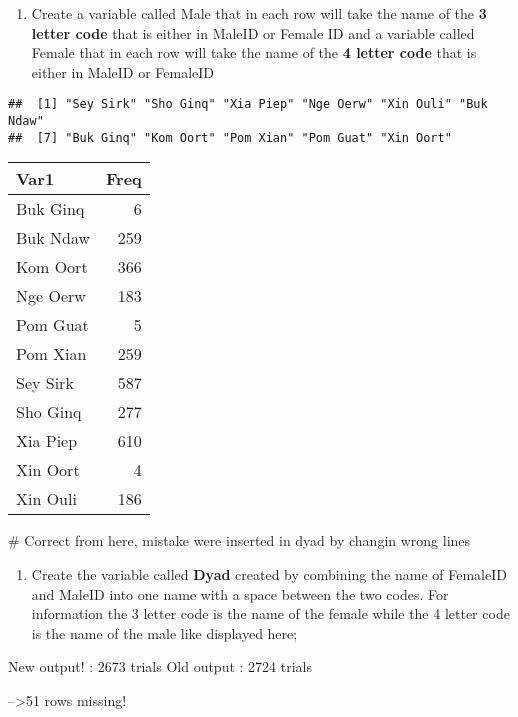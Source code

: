 \documentclass[
]{article}
\providecommand{\tightlist}{%
  \setlength{\itemsep}{0pt}\setlength{\parskip}{0pt}}
\begin{document}
\begin{enumerate}
\def\labelenumi{\arabic{enumi}.}
\tightlist
\item
  Create a variable called Male that in each row will take the name of
  the \textbf{3 letter code} that is either in MaleID or Female ID and a
  variable called Female that in each row will take the name of the
  \textbf{4 letter code} that is either in MaleID or FemaleID
\end{enumerate}

\begin{verbatim}
##  [1] "Sey Sirk" "Sho Ginq" "Xia Piep" "Nge Oerw" "Xin Ouli" "Buk Ndaw"
##  [7] "Buk Ginq" "Kom Oort" "Pom Xian" "Pom Guat" "Xin Oort"
\end{verbatim}

\begin{longtable}[]{@{}lr@{}}
\toprule
Var1 & Freq \\
\midrule
\endhead
Buk Ginq & 6 \\
Buk Ndaw & 259 \\
Kom Oort & 366 \\
Nge Oerw & 183 \\
Pom Guat & 5 \\
Pom Xian & 259 \\
Sey Sirk & 587 \\
Sho Ginq & 277 \\
Xia Piep & 610 \\
Xin Oort & 4 \\
Xin Ouli & 186 \\
\bottomrule
\end{longtable}

\# Correct from here, mistake were inserted in dyad by changin wrong
lines

\begin{enumerate}
\def\labelenumi{\arabic{enumi}.}
\setcounter{enumi}{1}
\tightlist
\item
  Create the variable called \textbf{Dyad} created by combining the name
  of FemaleID and MaleID into one name with a space between the two
  codes. For information the 3 letter code is the name of the female
  while the 4 letter code is the name of the male like displayed here;
\end{enumerate}

New output! : 2673 trials Old output : 2724 trials

--\textgreater51 rows missing!
\end{document}
